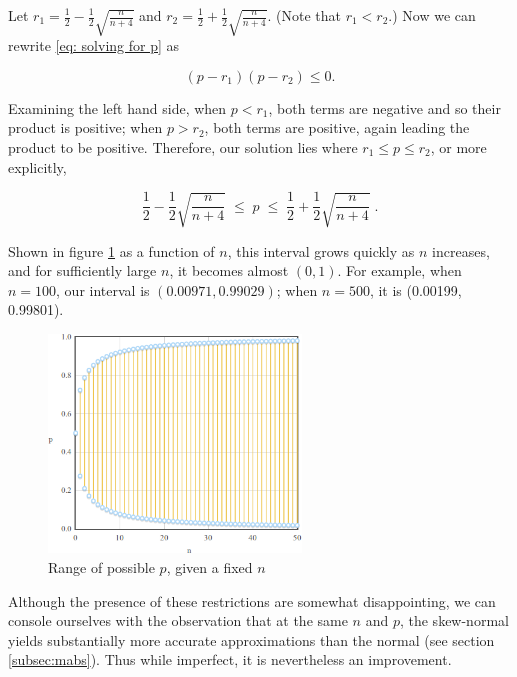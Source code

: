 \documentclass{article}
\begin{document}
Let $r_1 = \frac12 - \frac12 \sqrt{\frac{n}{n+4}}$ and $r_2 = \frac12 + \frac12
\sqrt{\frac{n}{n+4}}$. (Note that $r_1 < r_2$.) Now we can rewrite \eqref{eq:
solving for p} as

\begin{equation*}
  (p - r_1)(p - r_2) \leq 0.
\end{equation*}

Examining the left hand side, when $p < r_1$, both terms are negative and so
their product is positive; when $p > r_2$, both terms are positive, again
leading the product to be positive. Therefore, our solution lies where $r_1
\leq p \leq r_2$, or more explicitly,

\begin{equation}
 \frac12 - \frac12 \sqrt{\frac{n}{n+4}} \; \leq \; p \; \leq \; \frac12 + \frac12 \sqrt{\frac{n}{n+4}} \;.
\end{equation}

Shown in figure \ref{fig:sn-restriction-p-range} as a function of $n$, this
interval grows quickly as $n$ increases, and for sufficiently large $n$, it
becomes almost $(0, 1)$. For example, when $n=100$, our interval is $(0.00971,
0.99029)$; when $n=500$, it is (0.00199, 0.99801).

\begin{figure}
  \centering
  \includegraphics[width=0.6\textwidth]{../images/restriction-p-range.png}
  \caption{Range of possible $p$, given a fixed $n$}
  \label{fig:sn-restriction-p-range}
\end{figure}

Although the presence of these restrictions are somewhat disappointing, we can
console ourselves with the observation that at the same $n$ and $p$, the
skew-normal yields substantially more accurate approximations than the normal
(see section \ref{subsec:mabs}). Thus while imperfect, it is nevertheless an
improvement.
\end{document}
